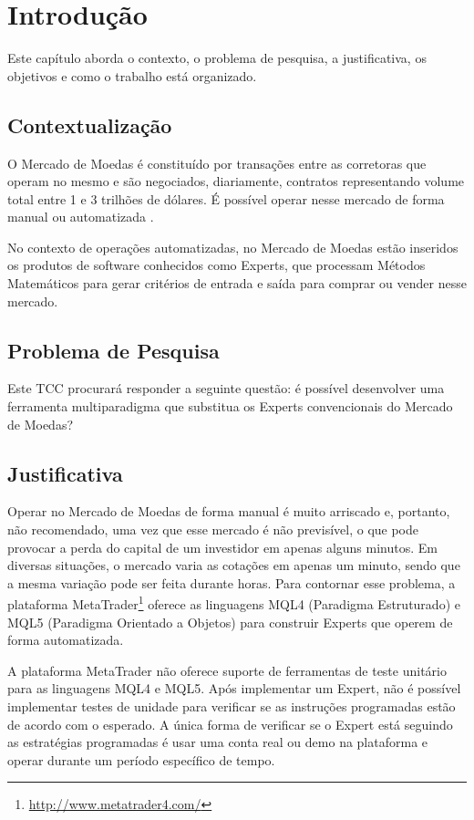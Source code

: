 \chapter{Introdução}
Este capítulo aborda o contexto, o problema de pesquisa, a justificativa, os objetivos e como o trabalho está organizado.

\section{Contextualização}
O Mercado de Moedas é constituído por transações entre as corretoras que operam no mesmo e são negociados, diariamente, contratos representando volume total entre 1 e 3 trilhões de dólares. É possível operar nesse mercado de forma manual ou automatizada \cite{cvm2009}.

No contexto de operações automatizadas, no Mercado de Moedas estão inseridos os produtos de software conhecidos como Experts, que processam Métodos Matemáticos para gerar critérios de entrada e saída para comprar ou vender nesse mercado.

\section{Problema de Pesquisa}
Este TCC procurará responder a seguinte questão: é possível desenvolver uma ferramenta multiparadigma que substitua os Experts convencionais do Mercado de Moedas? 

\section{Justificativa}

Operar no Mercado de Moedas de forma manual é muito arriscado e, portanto, não recomendado, uma vez que esse mercado é não previsível, o que pode provocar a perda do capital de um investidor em apenas alguns minutos. Em diversas situações, o mercado varia as cotações em apenas um minuto, sendo que a mesma variação pode ser feita durante horas. Para contornar esse problema, a plataforma MetaTrader\footnote{\url{http://www.metatrader4.com/}} oferece as linguagens MQL4 (Paradigma Estruturado) e MQL5 (Paradigma Orientado a Objetos) para construir Experts que operem de forma automatizada. 

A plataforma MetaTrader não oferece suporte de ferramentas de teste unitário para as linguagens MQL4 e MQL5. Após implementar um Expert, não é possível implementar testes de unidade para verificar se as instruções programadas estão de acordo com o esperado. A única forma de verificar se o Expert está seguindo as estratégias programadas é usar uma conta real ou demo na plataforma e operar durante um período específico de tempo.


